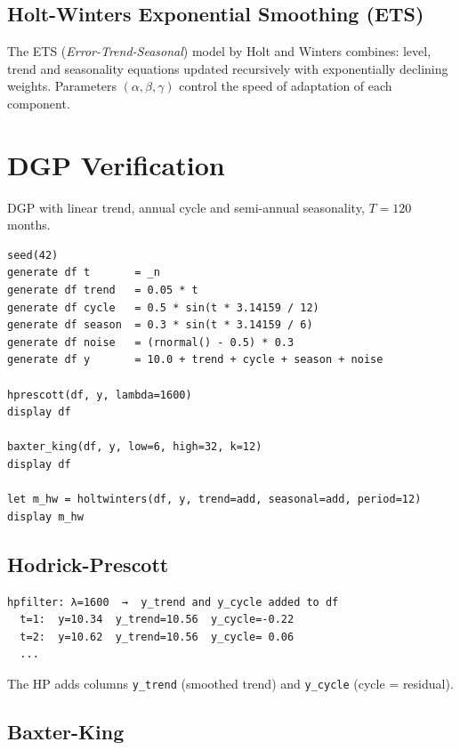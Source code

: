 \subsection*{Holt-Winters Exponential Smoothing (ETS)}

The ETS (\emph{Error-Trend-Seasonal}) model by Holt and Winters combines:
level, trend and seasonality equations updated recursively with
exponentially declining weights. Parameters $(\alpha, \beta, \gamma)$
control the speed of adaptation of each component.

\section{DGP Verification}

DGP with linear trend, annual cycle and semi-annual seasonality, $T = 120$ months.

\begin{lstlisting}[caption={Series with trend, cycle and seasonality}]
seed(42)
generate df t       = _n
generate df trend   = 0.05 * t
generate df cycle   = 0.5 * sin(t * 3.14159 / 12)
generate df season  = 0.3 * sin(t * 3.14159 / 6)
generate df noise   = (rnormal() - 0.5) * 0.3
generate df y       = 10.0 + trend + cycle + season + noise

hprescott(df, y, lambda=1600)
display df

baxter_king(df, y, low=6, high=32, k=12)
display df

let m_hw = holtwinters(df, y, trend=add, seasonal=add, period=12)
display m_hw
\end{lstlisting}

\subsection*{Hodrick-Prescott}

\begin{lstlisting}[language={}, basicstyle=\ttfamily\small,
  frame=none, numbers=none, backgroundcolor=\color{codbg},
  xleftmargin=0pt, xrightmargin=0pt, breaklines=false]
hpfilter: λ=1600  →  y_trend and y_cycle added to df
  t=1:  y=10.34  y_trend=10.56  y_cycle=-0.22
  t=2:  y=10.62  y_trend=10.56  y_cycle= 0.06
  ...
\end{lstlisting}

The HP adds columns \texttt{y\_trend} (smoothed trend) and \texttt{y\_cycle}
(cycle = residual).

\subsection*{Baxter-King}

